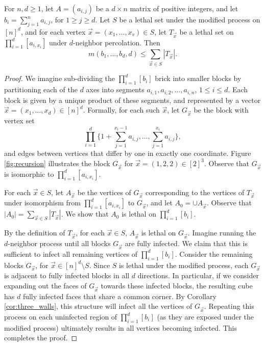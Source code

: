 \begin{lem}
\label{lem:recursion}
For $n,d \geq 1$, let $A = (a_{i,j})$ be a $d \times n$ matrix of positive integers, and let $b_i = \sum_{j=1}^n a_{i,j}$, for $1 \geq j \geq d$. Let $S$ be a lethal set under the modified process on $[n]^d$, and for each vertex $\vec{x} = (x_1, \dots, x_v) \in S$, let $T_{\vec{x}}$ be a lethal set on $\prod_{i=1}^d [a_{i,x_i}]$ under $d$-neighbor percolation. Then
$$m(b_1, \dots, b_d, d) \leq \sum_{\vec{x} \in S} |T_{\vec{x}}|.$$
\end{lem}

\begin{proof}
We imagine sub-dividing the $\prod_{i=1}^d [b_{i}]$ brick into smaller blocks by partitioning each of the $d$ axes into segments $a_{i,1}, a_{i,2}, \dots, a_{i,n}$, $1 \leq i \leq d$. Each block is given by a unique product of these segments, and represented by a vector $\vec{x} = (x_1, \dots, x_d) \in [n]^d$. Formally, for each such $\vec{x}$, let $G_{\vec{x}}$ be the block with vertex set
$$\prod_{i=1}^d \{1+ \sum_{j=1}^{x_i -1}a_{i,j}, \dots, \sum_{j=1}^{x_i}a_{i,j} \},$$
and edges between vertices that differ by one in exactly one coordinate. Figure \ref{fig:recursion} illustrates the block $G_{\vec{x}}$ for $\vec{x} = (1,2,2) \in [2]^3$. Observe that $G_{\vec{x}}$ is isomorphic to $\prod_{i=1}^d [a_{i,x_i}]$.

For each $\vec{x} \in S$, let $A_{\vec{x}}$ be the vertices of $G_{\vec{x}}$ corresponding to the vertices of $T_{\vec{x}}$ under isomorphism from $\prod_{i=1}^d [a_{i,x_i}]$ to $G_{\vec{x}}$, and let $A_0 = \cup A_{\vec{x}}$. Observe that $|A_0| = \sum_{\vec{x} \in S} |T_{\vec{x}}|$. We show that $A_0$ is lethal on $\prod_{i=1}^d [b_{i}]$.

By the definition of $T_{\vec{x}}$, for each $\vec{x} \in S$, $A_{\vec{x}}$ is lethal on $G_{\vec{x}}$. Imagine running the $d$-neighbor process until all blocks $G_{\vec{x}}$ are fully infected. We claim that this is sufficient to infect all remaining vertices of $\prod_{i=1}^d [b_{i}]$. Consider the remaining blocks $G_{\vec{x}}$, for $\vec{x} \in [n]^d \setminus S$. Since $S$ is lethal under the modified process, each $G_{\vec{x}}$ is adjacent to fully infected blocks in all $d$ directions. In particular, if we consider expanding out the faces of $G_{\vec{x}}$ towards these infected blocks, the resulting cube has $d$ fully infected faces that share a common corner. By Corollary \ref{cor:three_walls}, this structure will infect all the vertices of $G_{\vec{x}}$. Repeating this process on each uninfected region of $\prod_{i=1}^d [b_{i}]$ (as they are exposed under the modified process) ultimately results in all vertices becoming infected. This completes the proof. 
\end{proof}

